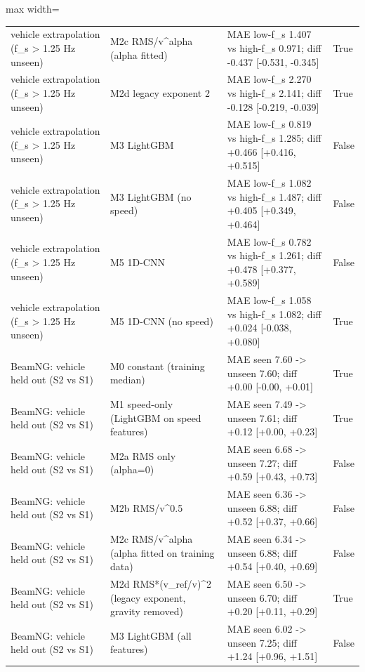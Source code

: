 \begin{table}[!htbp]
\begin{adjustbox}{max width=\columnwidth}
\begin{tabular}{>{\raggedright\arraybackslash}p{4.3cm}>{\raggedright\arraybackslash}p{4.3cm}>{\raggedright\arraybackslash}p{6.4cm}l}
vehicle extrapolation (f\_s \textgreater{} 1.25 Hz unseen) & M2c RMS/v\textasciicircum{}alpha (alpha fitted) & MAE low-f\_s 1.407 vs high-f\_s 0.971; diff -0.437 [-0.531, -0.345] & True \\
vehicle extrapolation (f\_s \textgreater{} 1.25 Hz unseen) & M2d legacy exponent 2 & MAE low-f\_s 2.270 vs high-f\_s 2.141; diff -0.128 [-0.219, -0.039] & True \\
vehicle extrapolation (f\_s \textgreater{} 1.25 Hz unseen) & M3 LightGBM & MAE low-f\_s 0.819 vs high-f\_s 1.285; diff +0.466 [+0.416, +0.515] & False \\
vehicle extrapolation (f\_s \textgreater{} 1.25 Hz unseen) & M3 LightGBM (no speed) & MAE low-f\_s 1.082 vs high-f\_s 1.487; diff +0.405 [+0.349, +0.464] & False \\
vehicle extrapolation (f\_s \textgreater{} 1.25 Hz unseen) & M5 1D-CNN & MAE low-f\_s 0.782 vs high-f\_s 1.261; diff +0.478 [+0.377, +0.589] & False \\
vehicle extrapolation (f\_s \textgreater{} 1.25 Hz unseen) & M5 1D-CNN (no speed) & MAE low-f\_s 1.058 vs high-f\_s 1.082; diff +0.024 [-0.038, +0.080] & True \\
BeamNG: vehicle held out (S2 vs S1) & M0 constant (training median) & MAE seen 7.60 -\textgreater{} unseen 7.60; diff +0.00 [-0.00, +0.01] & True \\
BeamNG: vehicle held out (S2 vs S1) & M1 speed-only (LightGBM on speed features) & MAE seen 7.49 -\textgreater{} unseen 7.61; diff +0.12 [+0.00, +0.23] & True \\
BeamNG: vehicle held out (S2 vs S1) & M2a RMS only (alpha=0) & MAE seen 6.68 -\textgreater{} unseen 7.27; diff +0.59 [+0.43, +0.73] & False \\
BeamNG: vehicle held out (S2 vs S1) & M2b RMS/v\textasciicircum{}0.5 & MAE seen 6.36 -\textgreater{} unseen 6.88; diff +0.52 [+0.37, +0.66] & False \\
BeamNG: vehicle held out (S2 vs S1) & M2c RMS/v\textasciicircum{}alpha (alpha fitted on training data) & MAE seen 6.34 -\textgreater{} unseen 6.88; diff +0.54 [+0.40, +0.69] & False \\
BeamNG: vehicle held out (S2 vs S1) & M2d RMS*(v\_ref/v)\textasciicircum{}2 (legacy exponent, gravity removed) & MAE seen 6.50 -\textgreater{} unseen 6.70; diff +0.20 [+0.11, +0.29] & True \\
BeamNG: vehicle held out (S2 vs S1) & M3 LightGBM (all features) & MAE seen 6.02 -\textgreater{} unseen 7.25; diff +1.24 [+0.96, +1.51] & False \\

\end{tabular}
\end{adjustbox}
\end{table}
